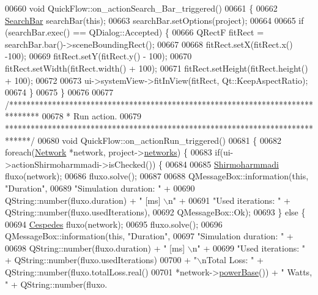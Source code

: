 \begin{DoxyCode}
00660 \textcolor{keywordtype}{void} QuickFlow::on\_actionSearch\_Bar\_triggered()
00661 \{
00662   \hyperlink{class_search_bar}{SearchBar} searchBar(\textcolor{keyword}{this});
00663   searchBar.setOptions(project);
00664 
00665   \textcolor{keywordflow}{if} (searchBar.exec() == QDialog::Accepted) \{
00666     QRectF fitRect = searchBar.bar()->sceneBoundingRect();
00667 
00668     fitRect.setX(fitRect.x() -100);
00669     fitRect.setY(fitRect.y() - 100);
00670     fitRect.setWidth(fitRect.width() + 100);
00671     fitRect.setHeight(fitRect.height() + 100);
00672 
00673     ui->systemView->fitInView(fitRect, Qt::KeepAspectRatio);
00674   \}
00675 \}
00676 
00677 \textcolor{comment}{/*******************************************************************************}
00678 \textcolor{comment}{ * Run action.}
00679 \textcolor{comment}{ ******************************************************************************/}
00680 \textcolor{keywordtype}{void} QuickFlow::on\_actionRun\_triggered()
00681 \{
00682   \textcolor{keywordflow}{foreach}(\hyperlink{class_network}{Network} *network, project->\hyperlink{class_project_aa98126154cab59769a431668e6f17daf}{networks}) \{
00683     \textcolor{keywordflow}{if}(ui->actionShirmoharmmadi->isChecked()) \{
00684 
00685       \hyperlink{class_shirmoharmmadi}{Shirmoharmmadi} fluxo(network);
00686       fluxo.solve();
00687 
00688       QMessageBox::information(\textcolor{keyword}{this}, \textcolor{stringliteral}{"Duration"},
00689                                \textcolor{stringliteral}{"Simulation duration: "} +
00690                                QString::number(fluxo.duration) + \textcolor{stringliteral}{" [ms] \(\backslash\)n"} +
00691                                \textcolor{stringliteral}{"Used iterations: "} + QString::number(fluxo.usedIterations),
00692                                QMessageBox::Ok);
00693     \} \textcolor{keywordflow}{else} \{
00694       \hyperlink{class_cespedes}{Cespedes} fluxo(network);
00695       fluxo.solve();
00696       QMessageBox::information(\textcolor{keyword}{this}, \textcolor{stringliteral}{"Duration"},
00697                                \textcolor{stringliteral}{"Simulation duration: "} +
00698                                QString::number(fluxo.duration) + \textcolor{stringliteral}{" [ms] \(\backslash\)n"} +
00699                                \textcolor{stringliteral}{"Used iterations: "} + QString::number(fluxo.usedIterations)
00700                                + \textcolor{stringliteral}{"\(\backslash\)nTotal Loss: "} + QString::number(fluxo.totalLoss.real()
00701                                    *network->\hyperlink{group___models_ga6fdbd7d04d12a3f1215c92e2e20eabdb}{powerBase}()) + \textcolor{stringliteral}{" Watts, "} +  QString::number(fluxo.

\end{DoxyCode}

